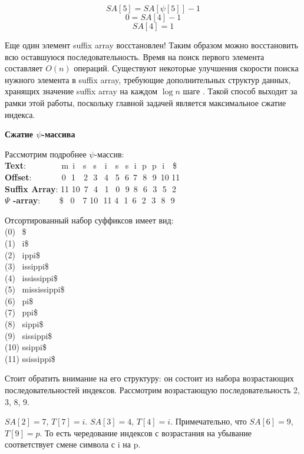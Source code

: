 \[SA[5] = SA[\psi[5]] - 1\]
\[0 = SA[4] - 1\]
\[SA[4] = 1\]

Еще один элемент suffix array восстановлен! Таким образом можно восстановить всю оставшуюся последовательность.
Время на поиск первого элемента составляет \(O(n)\) операций.
Существуют некоторые улучшения скорости поиска нужного элемента в suffix array, требующие дополнительных
структур данных, хранящих значение suffix array на каждом \(\log n\) шаге \cite{andersensimple}.
Такой способ выходит за рамки этой работы, поскольку главной задачей является максимальное сжатие индекса.

\textbf{Сжатие $\psi$-массива}

Рассмотрим подробнее $\psi$-массив:
\\ \textbf{Text}:\,\,\,\,\,\,\,\,\,\,\,\,\,\,\,\,\,\,\,\,\,\,\,\, m \,i \,\,\,\,s \,\,\,s \,\,\,\,i \,\,\,\,s \,\,\,s \,\,i \,\,p \,\,p \,\,i \,\,\,\,\$
\\ \textbf{Offset}:\,\,\,\,\,\,\,\,\,\,\,\,\,\,\,\,\,\,\,\, 0 \,\,1 \,\,\,\,2 \,\,3 \,\,\,4 \,\,\,5 \,\,6 \,7 \,\,8 \,\,9 \,10 11
\\ \textbf{Suffix Array}:   11 10 \,7 \,\,4 \,\,\,1 \,\,\,0 \,\,9 \,8 \,\,6 \,\,3 \,\,5 \,\,2
\\ \textbf{$\Psi$ -array}: \,\,\,\,\,\,\,\,\,\,\,\,\$ \,\,\,0 \,\,\,\,7 10 \,\,11 4 \,\,1 \,6 \,\,2 \,\,3 \,\,8 \,\,9

Отсортированный набор суффиксов имеет вид:
\\ (0) \,\,\,\$
\\ (1) \,\,\,i\$
\\ (2) \,\,\,ippi\$
\\ (3) \,\,\,issippi\$
\\ (4) \,\,\,ississippi\$
\\ (5) \,\,\,mississippi\$
\\ (6) \,\,\,pi\$
\\ (7) \,\,\,ppi\$
\\ (8) \,\,\,sippi\$
\\ (9) \,\,\,sissippi\$
\\ (10) ssippi\$
\\ (11) ssissippi\$

Стоит обратить внимание на его структуру: он состоит из набора возрастающих последовательностей индексов.
Рассмотрим возрастающую последовательность 2, 3, 8, 9.

$SA[2] = 7$, $T[7] = i$.
$SA[3] = 4$, $T[4] = i$. Примечательно, что $SA[6] = 9$, $T[9] = p$.
То есть чередование индексов с возрастания на убывание соответствует смене символа с i на p.

